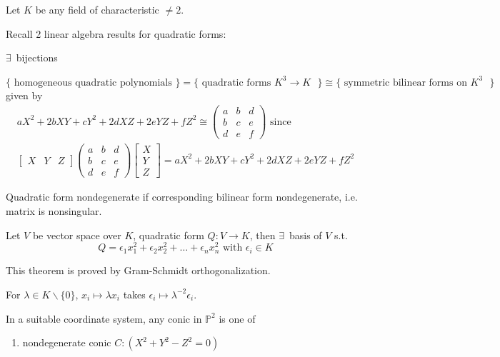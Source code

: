 Let $K$ be any field of characteristic $\neq 2$.

Recall 2 linear algebra results for quadratic forms:

\begin{proposition}
	$\exists \, $ bijections
	
	$\lbrace \text{ homogeneous quadratic polynomials } \rbrace = \lbrace \text{ quadratic forms $K^3 \to K$ } \rbrace \cong \lbrace \text{ symmetric bilinear forms on $K^3$ } \rbrace $
given by
\[
\begin{gathered} 
	aX^2 + 2bXY + cY^2 + 2dXZ + 2eYZ + fZ^2 \cong \left( \begin{matrix} a & b & d \\ b & c & e \\  d & e & f \end{matrix} \right) \text{ since } \\
	[ \begin{matrix} X & Y & Z \end{matrix} ] \left( \begin{matrix} a & b & d \\ b & c & e \\  d & e & f \end{matrix} \right) \left[ \begin{matrix} X \\ Y \\ Z \end{matrix} \right] = aX^2 + 2bXY + cY^2 + 2d XZ +2eYZ + fZ^2 
\end{gathered} 
\]
\end{proposition}
Quadratic form nondegenerate if corresponding bilinear form nondegenerate, i.e. matrix is nonsingular.

\begin{theorem}\label{agat:Thm:DiagonalizedQuadraticForm}
Let $V$ be vector space over $K$, quadratic form $Q:V \to K$, then $\exists \, $ basis of $V$ s.t.
\begin{equation}
Q = \epsilon_1 x_1^2 + \epsilon_2 x_2^2 + \dots + \epsilon_n x_n^2 \text{ with } \epsilon_i \in K
\end{equation}
\end{theorem}
This theorem is proved by Gram-Schmidt orthogonalization.

For $\lambda \in K \backslash \lbrace 0 \rbrace$, $x_i \mapsto \lambda x_i$ takes $\epsilon_i \mapsto \lambda^{-2} \epsilon_i$.  

\begin{corollary}\label{agat:Cor:ConicsClassification}
In a suitable coordinate system, any conic in $\mathbb{P}^2$ is one of 
\begin{enumerate}
\item[(a)] nondegenerate conic $C: (X^2 + Y^2- Z^2 =0)$
\end{enumerate}
\end{corollary}

